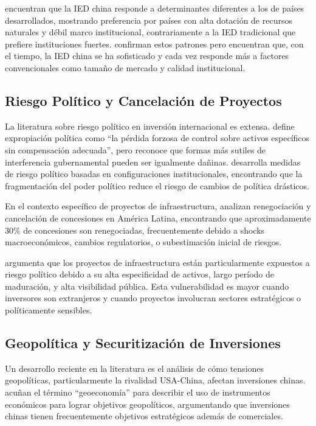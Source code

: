 \documentclass[12pt]{article}
\begin{document}
\citet{buckley2007determinants} encuentran que la IED china responde a determinantes diferentes a los de países desarrollados, mostrando preferencia por países con alta dotación de recursos naturales y débil marco institucional, contrariamente a la IED tradicional que prefiere instituciones fuertes. \citet{cheung2012china} confirman estos patrones pero encuentran que, con el tiempo, la IED china se ha sofisticado y cada vez responde más a factores convencionales como tamaño de mercado y calidad institucional.

\subsection{Riesgo Político y Cancelación de Proyectos}

La literatura sobre riesgo político en inversión internacional es extensa. \citet{kobrin1979political} define expropiación política como ``la pérdida forzosa de control sobre activos específicos sin compensación adecuada'', pero reconoce que formas más sutiles de interferencia gubernamental pueden ser igualmente dañinas. \citet{henisz2000institutional} desarrolla medidas de riesgo político basadas en configuraciones institucionales, encontrando que la fragmentación del poder político reduce el riesgo de cambios de política drásticos.

En el contexto específico de proyectos de infraestructura, \citet{guasch2008granting} analizan renegociación y cancelación de concesiones en América Latina, encontrando que aproximadamente 30\% de concesiones son renegociadas, frecuentemente debido a shocks macroeconómicos, cambios regulatorios, o subestimación inicial de riesgos. 

\citet{henisz2005politics} argumenta que los proyectos de infraestructura están particularmente expuestos a riesgo político debido a su alta especificidad de activos, largo período de maduración, y alta visibilidad pública. Esta vulnerabilidad es mayor cuando inversores son extranjeros y cuando proyectos involucran sectores estratégicos o políticamente sensibles.

\subsection{Geopolítica y Securitización de Inversiones}

Un desarrollo reciente en la literatura es el análisis de cómo tensiones geopolíticas, particularmente la rivalidad USA-China, afectan inversiones chinas. \citet{blackwill2016war} acuñan el término ``geoeconomía'' para describir el uso de instrumentos económicos para lograr objetivos geopolíticos, argumentando que inversiones chinas tienen frecuentemente objetivos estratégicos además de comerciales.
\end{document}
